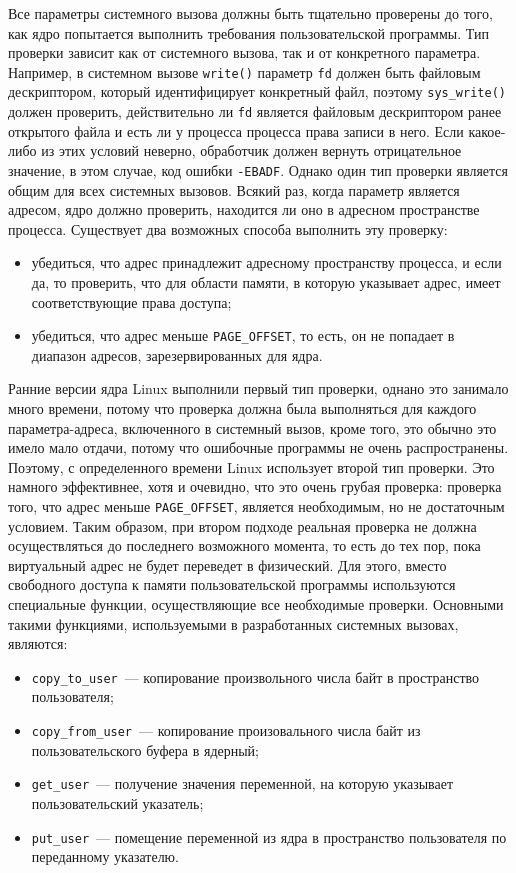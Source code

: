 Все параметры системного вызова должны быть тщательно проверены до того, как
ядро попытается выполнить требования пользовательской программы. Тип проверки
зависит как от системного вызова, так и от конкретного параметра. Например, в
системном вызове \texttt{write()} параметр \texttt{fd} должен быть файловым
дескриптором, который идентифицирует конкретный файл, поэтому
\texttt{sys\_write()} должен проверить, действительно ли \texttt{fd} является
файловым дескриптором ранее открытого файла и есть ли у процесса процесса права
записи в него. Если какое-либо из этих условий неверно, обработчик должен
вернуть отрицательное значение, в этом случае, код ошибки \texttt{-EBADF}.
Однако один тип проверки является общим для всех системных вызовов. Всякий раз,
когда параметр является адресом, ядро должно проверить, находится ли оно в
адресном пространстве процесса. Существует два возможных способа выполнить эту
проверку:
\begin{itemize}
\item убедиться, что адрес принадлежит адресному пространству процесса, и если
  да, то проверить, что для области памяти, в которую указывает адрес, имеет
  соответствующие права доступа;
\item убедиться, что адрес меньше \texttt{PAGE\_OFFSET}, то есть, он не попадает
  в диапазон адресов, зарезервированных для ядра.
\end{itemize}

Ранние версии ядра Linux выполнили первый тип проверки, однано это занимало
много времени, потому что проверка должна была выполняться для каждого
параметра-адреса, включенного в системный вызов, кроме того, это обычно это
имело мало отдачи, потому что ошибочные программы не очень распространены.
Поэтому, с определенного времени Linux использует второй тип проверки. Это
намного эффективнее, хотя и очевидно, что это очень грубая проверка: проверка
того, что адрес меньше \texttt{PAGE\_OFFSET}, является необходимым, но не
достаточным условием. Таким образом, при втором подходе реальная проверка не
должна осуществляться до последнего возможного момента, то есть до тех пор, пока
виртуальный адрес не будет переведет в физический. Для этого, вместо свободного
доступа к памяти пользовательской программы используются специальные функции,
осуществляющие все необходимые проверки. Основными такими функциями,
используемыми в разработанных системных вызовах, являются:
\begin{itemize}
\item \texttt{copy\_to\_user}~--- копирование произвольного числа байт в
  пространство пользователя;
\item \texttt{copy\_from\_user}~--- копирование произовального числа байт из
  пользовательского буфера в ядерный;
\item \texttt{get\_user}~--- получение значения переменной, на которую указывает
  пользовательский указатель;
\item \texttt{put\_user}~--- помещение переменной из ядра в пространство
  пользователя по переданному указателю.
\end{itemize}

